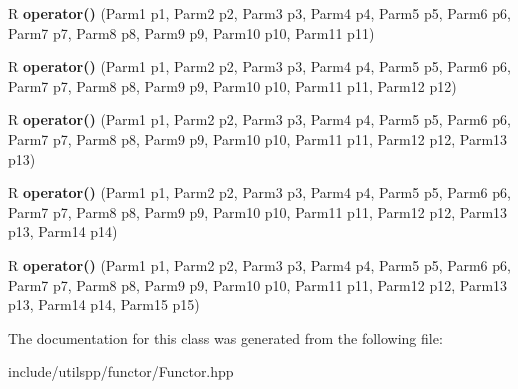 \begin{DoxyCompactItemize}
\item 
\hypertarget{classutilspp_1_1Functor_af142c2d8213ad7c45bd9d9f1f0f0789c}{R {\bfseries operator()} (Parm1 p1, Parm2 p2, Parm3 p3, Parm4 p4, Parm5 p5, Parm6 p6, Parm7 p7, Parm8 p8, Parm9 p9, Parm10 p10, Parm11 p11)}\label{classutilspp_1_1Functor_af142c2d8213ad7c45bd9d9f1f0f0789c}

\item 
\hypertarget{classutilspp_1_1Functor_a137a728e1c6b12b89d760f8440067c5a}{R {\bfseries operator()} (Parm1 p1, Parm2 p2, Parm3 p3, Parm4 p4, Parm5 p5, Parm6 p6, Parm7 p7, Parm8 p8, Parm9 p9, Parm10 p10, Parm11 p11, Parm12 p12)}\label{classutilspp_1_1Functor_a137a728e1c6b12b89d760f8440067c5a}

\item 
\hypertarget{classutilspp_1_1Functor_a58df5cae9e0cf66ee3d8d5c3a8e7e18e}{R {\bfseries operator()} (Parm1 p1, Parm2 p2, Parm3 p3, Parm4 p4, Parm5 p5, Parm6 p6, Parm7 p7, Parm8 p8, Parm9 p9, Parm10 p10, Parm11 p11, Parm12 p12, Parm13 p13)}\label{classutilspp_1_1Functor_a58df5cae9e0cf66ee3d8d5c3a8e7e18e}

\item 
\hypertarget{classutilspp_1_1Functor_a09e6761a67513d2365b9e443869b0c2b}{R {\bfseries operator()} (Parm1 p1, Parm2 p2, Parm3 p3, Parm4 p4, Parm5 p5, Parm6 p6, Parm7 p7, Parm8 p8, Parm9 p9, Parm10 p10, Parm11 p11, Parm12 p12, Parm13 p13, Parm14 p14)}\label{classutilspp_1_1Functor_a09e6761a67513d2365b9e443869b0c2b}

\item 
\hypertarget{classutilspp_1_1Functor_adc37428ffbe848078e9a1b2c7331770a}{R {\bfseries operator()} (Parm1 p1, Parm2 p2, Parm3 p3, Parm4 p4, Parm5 p5, Parm6 p6, Parm7 p7, Parm8 p8, Parm9 p9, Parm10 p10, Parm11 p11, Parm12 p12, Parm13 p13, Parm14 p14, Parm15 p15)}\label{classutilspp_1_1Functor_adc37428ffbe848078e9a1b2c7331770a}

\end{DoxyCompactItemize}


The documentation for this class was generated from the following file\-:\begin{DoxyCompactItemize}
\item 
include/utilspp/functor/Functor.\-hpp\end{DoxyCompactItemize}
